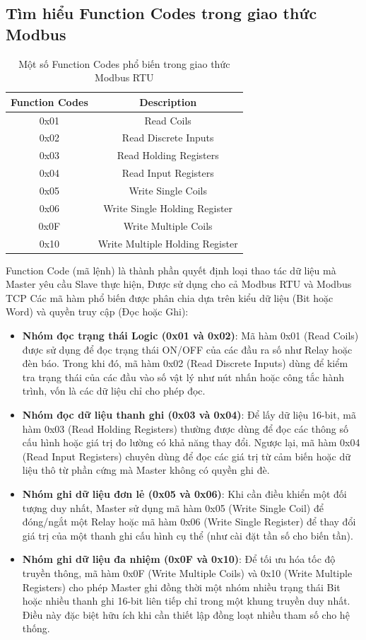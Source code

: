 \subsection{Tìm hiểu Function Codes trong giao thức Modbus}
\begin{table}[h]
\centering
\begin{tabular}{|c|c|}
\hline
\textbf{Function Codes} & \textbf{Description} \\ \hline
0x01 & Read Coils \\ \hline
0x02 & Read Discrete Inputs \\ \hline
0x03 & Read Holding Registers \\ \hline
0x04 & Read Input Registers \\ \hline
0x05 & Write Single Coils \\ \hline
0x06 & Write Single Holding Register \\ \hline
0x0F & Write Multiple Coils \\ \hline
0x10 & Write Multiple Holding Register \\ \hline
\end{tabular}
\caption{Một số Function Codes phổ biến trong giao thức Modbus RTU}
\label{tab:modbus_codes}
\end{table}

Function Code (mã lệnh) là thành phần quyết định loại thao tác dữ liệu mà Master yêu cầu Slave thực hiện, 
Được sử dụng cho cả Modbus RTU và Modbus TCP Các mã hàm phổ biến được phân chia dựa trên kiểu dữ liệu 
(Bit hoặc Word) và quyền truy cập (Đọc hoặc Ghi):
\begin{itemize}
    \item \textbf{Nhóm đọc trạng thái Logic (0x01 và 0x02)}: Mã hàm 0x01 (Read Coils) được sử dụng để đọc trạng thái ON/OFF của các đầu ra số như Relay hoặc đèn báo.
    Trong khi đó, mã hàm 0x02 (Read Discrete Inputs) dùng để kiểm tra trạng thái của các đầu vào số vật lý như nút nhấn hoặc công tắc hành trình, vốn là các dữ liệu 
    chỉ cho phép đọc.
    \item \textbf{Nhóm đọc dữ liệu thanh ghi (0x03 và 0x04)}: Để lấy dữ liệu 16-bit, mã hàm 0x03 (Read Holding Registers) thường được dùng để đọc các thông số cấu hình 
    hoặc giá trị đo lường có khả năng thay đổi. Ngược lại, mã hàm 0x04 (Read Input Registers) chuyên dùng để đọc các giá trị từ cảm biến hoặc dữ liệu thô từ phần cứng 
    mà Master không có quyền ghi đè.
    \item \textbf{Nhóm ghi dữ liệu đơn lẻ (0x05 và 0x06)}: Khi cần điều khiển một đối tượng duy nhất, Master sử dụng mã hàm 0x05 (Write Single Coil) để đóng/ngắt một 
    Relay hoặc mã hàm 0x06 (Write Single Register) để thay đổi giá trị của một thanh ghi cấu hình cụ thể (như cài đặt tần số cho biến tần).
    \item \textbf{Nhóm ghi dữ liệu đa nhiệm (0x0F và 0x10)}: Để tối ưu hóa tốc độ truyền thông, mã hàm 0x0F (Write Multiple Coils) và 0x10 (Write Multiple Registers) 
    cho phép Master ghi đồng thời một nhóm nhiều trạng thái Bit hoặc nhiều thanh ghi 16-bit liên tiếp chỉ trong một khung truyền duy nhất. Điều này đặc biệt hữu ích 
    khi cần thiết lập đồng loạt nhiều tham số cho hệ thống.
\end{itemize}
